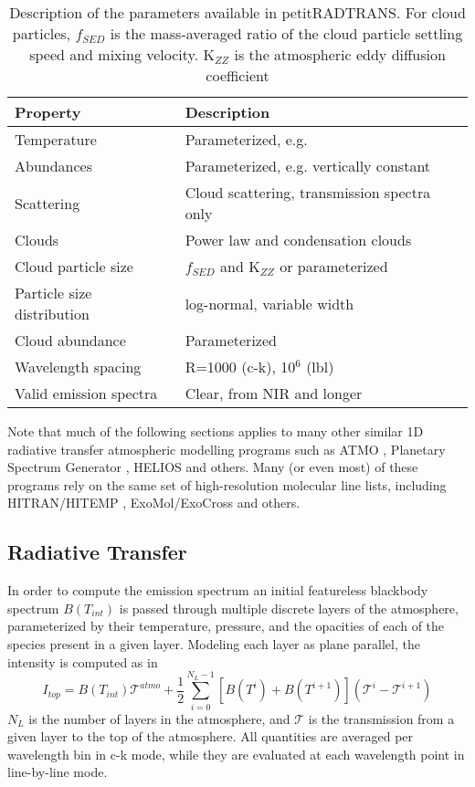 \begin{table}[t]
	\centering
	\begin{tabular}{ll}
		\toprule
		\textbf{Property} & \textbf{Description}\\
		\midrule
		Temperature & Parameterized, e.g. \parencite{Guillot2010}\\
		Abundances & Parameterized, e.g. vertically constant\\
		Scattering & Cloud scattering, transmission spectra only\\
		Clouds & Power law and condensation clouds\\
		Cloud particle size & $f_{SED}$ and K$_{ZZ}$ or parameterized\\
		Particle size distribution & log-normal, variable width\\
		Cloud abundance & Parameterized\\
		Wavelength spacing & R=1000 (c-k), 10$^{6}$ (lbl)\\
		Valid emission spectra & Clear, from NIR and longer\\
		\bottomrule
	\end{tabular}
	\caption{Description of the parameters available in petitRADTRANS. For cloud particles, $f_{SED}$ is the mass-averaged ratio of the cloud particle settling speed and mixing velocity. K$_{ZZ}$ is the atmospheric eddy diffusion coefficient \parencite{Ackerman2001}}
	\label{tab:petitradparams}
\end{table}

Note that much of the following sections applies to many other similar 1D radiative transfer atmospheric modelling programs such as ATMO \parencite{Goyal2018}, Planetary Spectrum Generator \parencite{Villanueva2018}, HELIOS \parencite{Malik2017,Malik2019} and others.
Many (or even most) of these programs rely on the same set of high-resolution molecular line lists, including HITRAN/HITEMP \parencite{Rothman1973,Rothman2010,Gordon2017}, ExoMol/ExoCross \parencite{Tennyson2016,Tennyson2016a,Yurchenko2018} and others. 

\subsection{Radiative Transfer}
In order to compute the emission spectrum an initial featureless blackbody spectrum $B(T_{int})$ is passed through multiple discrete layers of the atmosphere, parameterized by their temperature, pressure, and the opacities of each of the species present in a given layer.
Modeling each layer as plane parallel, the intensity is computed as in \parencite{Irwin2008,Molliere2017,Molliere2019}
\begin{equation}
I_{top} = B(T_{int})\mathcal{T}^{atmo} + \frac{1}{2}\sum_{i=0}^{N_{L}-1}\left[B(T^{i}) + B(T^{i+1})\right]\left(\mathcal{T}^{i}-\mathcal{T}^{i+1}\right)
\end{equation}
$N_{L}$ is the number of layers in the atmosphere, and $\mathcal{T}$ is the transmission from a given layer to the top of the atmosphere. All quantities are averaged per wavelength bin in c-k mode, while they are evaluated at each wavelength point in line-by-line mode.

